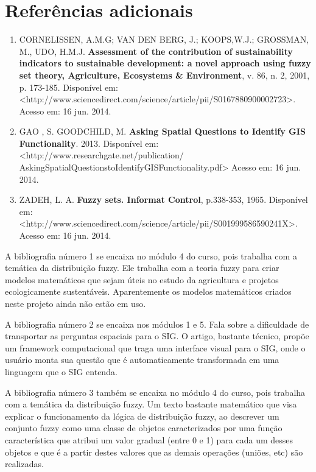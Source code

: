 \section{Referências adicionais}

\begin{enumerate}

\item CORNELISSEN, A.M.G; VAN DEN BERG, J.; KOOPS,W.J.; GROSSMAN, M., UDO, H.M.J. \textbf{Assessment of the contribution of sustainability indicators to sustainable development: a novel approach using fuzzy set theory, Agriculture, Ecosystems \& Environment}, v. 86, n. 2, 2001, p. 173-185. Disponível em: <http://www.sciencedirect.com/science/article/pii/S0167880900002723>. Acesso em: 16 jun. 2014.

\item GAO , S. GOODCHILD, M. \textbf{Asking Spatial Questions to Identify GIS Functionality}. 2013. Disponível em: <http://www.researchgate.net/publication/ AskingSpatialQuestionstoIdentifyGISFunctionality.pdf> Acesso em: 16 jun. 2014.

\item ZADEH, L. A. \textbf{Fuzzy sets. Informat Control}, p.338-353, 1965. Disponível em: <http://www.sciencedirect.com/science/article/pii/S001999586590241X>. Acesso em: 16 jun. 2014.

\end{enumerate}

A bibliografia número 1 se encaixa no módulo 4 do curso, pois trabalha com a temática da distribuição fuzzy. Ele trabalha com a teoria fuzzy para criar modelos matemáticos que sejam úteis no estudo da agricultura e projetos ecologicamente sustentáveis. Aparentemente os modelos matemáticos criados neste projeto ainda não estão em uso.

A bibliografia número 2 se encaixa nos módulos 1 e 5. Fala sobre a dificuldade de transportar as perguntas espaciais para o SIG. O artigo, bastante técnico, propõe um framework computacional que traga uma interface visual para o SIG, onde o usuário monta sua questão que é automaticamente transformada em uma linguagem que o SIG entenda.

A bibliografia número 3 também se encaixa no módulo 4 do curso, pois trabalha com a temática da distribuição fuzzy. Um texto bastante matemático que visa explicar o funcionamento da lógica de distribuição fuzzy, ao descrever um conjunto fuzzy como uma classe de objetos caracterizados por uma função característica que atribui um valor gradual (entre 0 e 1) para cada um desses objetos e que é a partir destes valores que as demais operações (uniões, etc) são realizadas.
